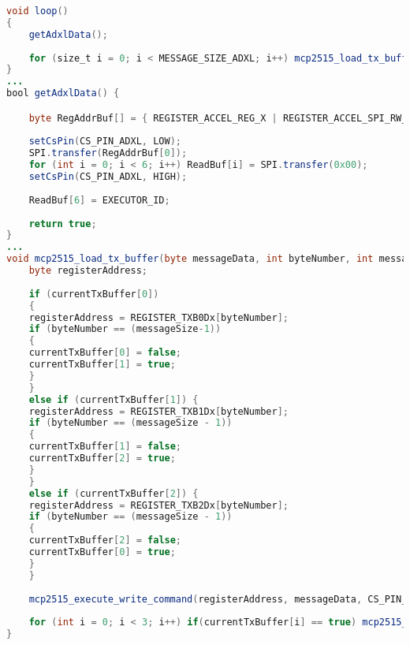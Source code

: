 \label{lst:mcpExecutorLoop}
\begin{lstlisting}[language=Java, caption=Loop Routine]
void loop()
{
	getAdxlData();
	
	for (size_t i = 0; i < MESSAGE_SIZE_ADXL; i++) mcp2515_load_tx_buffer(ReadBuf[i], i, MESSAGE_SIZE_ADXL);
}
...
bool getAdxlData() {

	byte RegAddrBuf[] = { REGISTER_ACCEL_REG_X | REGISTER_ACCEL_SPI_RW_BIT | REGISTER_ACCEL_SPI_MB_BIT };
	
	setCsPin(CS_PIN_ADXL, LOW);
	SPI.transfer(RegAddrBuf[0]);
	for (int i = 0; i < 6; i++) ReadBuf[i] = SPI.transfer(0x00); 
	setCsPin(CS_PIN_ADXL, HIGH);
	
	ReadBuf[6] = EXECUTOR_ID;
	
	return true;
}
...
void mcp2515_load_tx_buffer(byte messageData, int byteNumber, int messageSize) {
	byte registerAddress;
	
	if (currentTxBuffer[0])
	{
	registerAddress = REGISTER_TXB0Dx[byteNumber];
	if (byteNumber == (messageSize-1))
	{
	currentTxBuffer[0] = false;
	currentTxBuffer[1] = true;
	}
	}
	else if (currentTxBuffer[1]) {
	registerAddress = REGISTER_TXB1Dx[byteNumber];
	if (byteNumber == (messageSize - 1))
	{
	currentTxBuffer[1] = false;
	currentTxBuffer[2] = true;
	}
	}
	else if (currentTxBuffer[2]) {
	registerAddress = REGISTER_TXB2Dx[byteNumber];
	if (byteNumber == (messageSize - 1))
	{
	currentTxBuffer[2] = false;
	currentTxBuffer[0] = true;
	}
	}
	
	mcp2515_execute_write_command(registerAddress, messageData, CS_PIN_MCP2515);
	
	for (int i = 0; i < 3; i++) if(currentTxBuffer[i] == true) mcp2515_execute_rts_command(i);	
}
\end{lstlisting}